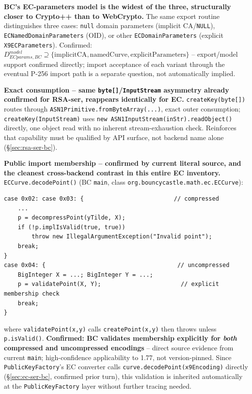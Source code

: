 \documentclass[11pt,a4paper]{article}
\begin{document}
\textbf{BC's EC-parameters model is the widest of the three, structurally closer to Crypto++ than to WebCrypto.} The same export routine distinguishes three cases: \texttt{null} domain parameters (implicit CA/\texttt{NULL}), \texttt{ECNamedDomainParameters} (OID), or other \texttt{ECDomainParameters} (explicit \texttt{X9ECParameters}). Confirmed: $D_{ECparams,BC}^{model} \supseteq \{\text{implicitCA}, \text{namedCurve}, \text{explicitParameters}\}$ -- export/model support confirmed directly; import acceptance of each variant through the eventual P-256 import path is a separate question, not automatically implied.

\textbf{Exact consumption -- same \texttt{byte[]}/\texttt{InputStream} asymmetry already confirmed for RSA-ser, reappears identically for EC.} \texttt{createKey(byte[])} routes through \texttt{ASN1Primitive.fromByteArray(...)}, exact outer consumption; \texttt{createKey(InputStream)} uses \texttt{new ASN1InputStream(inStr).readObject()} directly, one object read with no inherent stream-exhaustion check. Reinforces that capability must be qualified by API surface, not backend name alone (\S\ref{sec:rsa-ser-bc}).

\textbf{Public import membership -- confirmed by current literal source, and the cleanest cross-backend contrast in this entire EC inventory.} \texttt{ECCurve.decodePoint()} (BC \texttt{main}, class \texttt{org.bouncycastle.math.ec.ECCurve}):
\begin{verbatim}
case 0x02: case 0x03: {                          // compressed
    ...
    p = decompressPoint(yTilde, X);
    if (!p.implIsValid(true, true))
        throw new IllegalArgumentException("Invalid point");
    break;
}
case 0x04: {                                      // uncompressed
    BigInteger X = ...; BigInteger Y = ...;
    p = validatePoint(X, Y);                       // explicit membership check
    break;
}
\end{verbatim}
where \texttt{validatePoint(x,y)} calls \texttt{createPoint(x,y)} then throws unless \texttt{p.isValid()}. \textbf{Confirmed: BC validates membership explicitly for \emph{both} compressed and uncompressed encodings} -- direct source evidence from current \texttt{main}; high-confidence applicability to 1.77, not version-pinned. Since \texttt{PublicKeyFactory}'s EC converter calls \texttt{curve.decodePoint(x9Encoding)} directly (\S\ref{sec:ec-ser-bc}, confirmed prior turn), this validation is inherited automatically at the \texttt{PublicKeyFactory} layer without further tracing needed.
\end{document}
